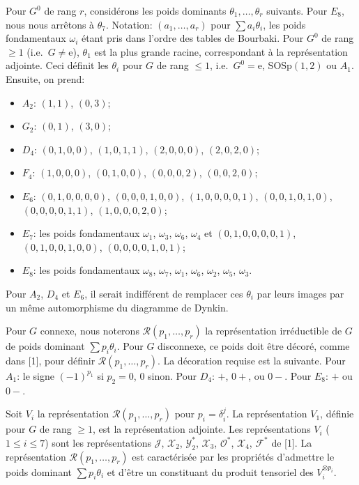 \documentclass[11pt,a4paper]{article}
\theoremstyle{plain}
\theoremstyle{definition}
\begin{document}
Pour $G^0$ de rang $r$, consid\'erons les poids dominants $\theta_1,\dots,\theta_r$ suivants. Pour $E_8$, nous nous arr\^etons \`a $\theta_7$. Notation: $(a_1,\dots,a_r)$ pour $\sum a_i \theta_i$, les poids fondamentaux $\omega_i$ \'etant pris dans l'ordre des tables de Bourbaki. Pour $G^0$ de rang $\geq 1$ (i.e.\ $G \not= \text{e}$), $\theta_1$ est la plus grande racine, correspondant \`a la repr\'esentation adjointe. Ceci d\'efinit les $\theta_i$ pour $G$ de rang $\leq 1$, i.e.\ $G^0 = \text{e}$, $\mathrm{SOSp}(1,2)$ ou $A_1$. Ensuite, on prend:
\begin{itemize}[leftmargin=2em]
\item[] $A_2$: $(1,1)$, $(0,3)$;
\item[] $G_2$: $(0,1)$, $(3,0)$;
\item[] $D_4$: $(0,1,0,0)$, $(1,0,1,1)$, $(2,0,0,0)$, $(2,0,2,0)$;
\item[] $F_4$: $(1,0,0,0)$, $(0,1,0,0)$, $(0,0,0,2)$, $(0,0,2,0)$;
\item[] $E_6$: $(0,1,0,0,0,0)$, $(0,0,0,1,0,0)$, $(1,0,0,0,0,1)$, $(0,0,1,0,1,0)$, $(0,0,0,0,1,1)$, $(1,0,0,0,2,0)$;
\item[] $E_7$: les poids fondamentaux $\omega_1$, $\omega_3$, $\omega_6$, $\omega_4$ et $(0,1,0,0,0,0,1)$, $(0,1,0,0,1,0,0)$, $(0,0,0,0,1,0,1)$;
\item[] $E_8$: les poids fondamentaux $\omega_8$, $\omega_7$, $\omega_1$, $\omega_6$, $\omega_2$, $\omega_5$, $\omega_3$.
\end{itemize}
Pour $A_2$, $D_4$ et $E_6$, il serait indiff\'erent de remplacer ces $\theta_i$ par leurs images par un m\^eme automorphisme du diagramme de Dynkin.

Pour $G$ connexe, nous noterons $\mathcal{R}(p_1,\dots,p_r)$ la repr\'esentation irr\'eductible de $G$ de poids dominant $\sum p_i \theta_i$. Pour $G$ disconnexe, ce poids doit \^etre d\'ecor\'e, comme dans [1], pour d\'efinir $\mathcal{R}(p_1,\dots,p_r)$. La d\'ecoration requise est la suivante. Pour $A_1$: le signe $(-1)^{p_1}$ si $p_2 = 0$, $0$ sinon. Pour $D_4$: $+$, $0+$, ou $0-$. Pour $E_8$: $+$ ou $0-$.

Soit $V_i$ la repr\'esentation $\mathcal{R}(p_1,\dots,p_r)$ pour $p_i = \delta_i^j$. La repr\'esentation $V_1$, d\'efinie pour $G$ de rang $\geq 1$, est la repr\'esentation adjointe. Les repr\'esentations $V_i$ ($1 \leq i \leq 7$) sont les repr\'esentations $\mathcal{J}$, $\mathcal{X}_2$, $\mathcal{Y}_2^*$, $\mathcal{X}_3$, $\mathcal{O}^*$, $\mathcal{X}_4$, $\mathcal{F}^*$ de [1]. La repr\'esentation $\mathcal{R}(p_1,\dots,p_r)$ est caract\'eris\'ee par les propri\'et\'es d'admettre le poids dominant $\sum p_i \theta_i$ et d'\^etre un constituant du produit tensoriel des $V_i^{\otimes p_i}$.
\end{document}
